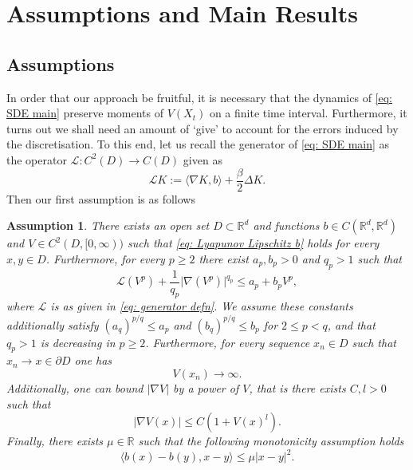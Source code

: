 \documentclass{article}
\newtheorem{assmp}{Assumption}
\begin{document}
\section{Assumptions and Main Results}
\subsection{Assumptions}
In order that our approach be fruitful, it is necessary that the dynamics of \eqref{eq: SDE main} preserve moments of $V(X_t)$ on a finite time interval. Furthermore, it turns out we shall need an amount of `give' to account for the errors induced by the discretisation. To this end, let us recall the generator of \eqref{eq: SDE main} as the operator $\mathcal{L}:C^2(D)\to C(D)$ given as
\begin{equation}\label{eq: generator defn}
\mathcal{L} K :=\langle \nabla K, b\rangle +\frac{\beta}{2}\Delta K.
\end{equation}
Then our first assumption is as follows
\begin{assmp}\label{assmp: Lyapunov fn}
There exists an open set $D\subset \mathbb{R}^d$ and functions $b\in C(\mathbb{R}^d,\mathbb{R}^d)$ and $V\in C^2(D,[0,\infty))$ such that \eqref{eq: Lyapunov Lipschitz b} holds for every $x,y \in D$. Furthermore, for every $p\geq 2$ there exist $a_p,b_p>0$ and $q_p>1$ such that 
\begin{equation}\label{eq: generator assmp}
\mathcal{L} (V^p) +\frac{1}{q_p}\lvert \nabla (V^p)\rvert^{q_p}\leq a_p +b_pV^p,
\end{equation}
where $\mathcal{L}$ is as given in \eqref{eq: generator defn}. We assume these constants additionally satisfy $(a_q)^{p/q}\leq a_p$ and $(b_q)^{p/q}\leq b_p$ for $2\leq p<q$, and that $q_p>1$ is decreasing in $p\geq 2$. Furthermore, for every sequence $x_n\in D$ such that $x_n\to x\in \partial D$ one has
\begin{equation}\label{eq: explosion on boundary}
    V(x_n)\to \infty.
\end{equation}
Additionally, one can bound $\lvert \nabla V\rvert$ by a power of $V$, that is there exists $C,l>0$ such that
\begin{equation}\label{eq: nabla V power bound}
\lvert \nabla V(x)\rvert \leq C(1+V(x)^l).
\end{equation}
Finally, there exists $\mu\in \mathbb{R}$ such that the following monotonicity assumption holds
\begin{equation}\label{eq: mon assump}
\langle b(x)-b(y),x-y\rangle\leq \mu \lvert x-y\rvert^2.
\end{equation}
\end{assmp}
\end{document}
